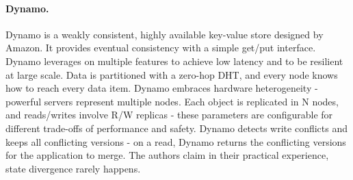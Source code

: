 %



\paragraph{Dynamo.} Dynamo \cite{dynamo} is a weakly consistent, highly available key-value store designed by Amazon.
It provides eventual consistency with a simple get/put interface.
Dynamo leverages on multiple features to achieve low latency and to be resilient at large scale.
Data is partitioned with a zero-hop DHT, and every node knows how to reach every data item.
Dynamo embraces hardware heterogeneity - powerful servers represent multiple nodes.
Each object is replicated in N nodes, and reads/writes involve R/W replicas - these parameters are configurable for different trade-offs of performance and safety.
Dynamo detects write conflicts and keeps all conflicting versions - on a read, Dynamo returns the conflicting versions for the application to merge.
The authors claim in their practical experience, state divergence rarely happens.

